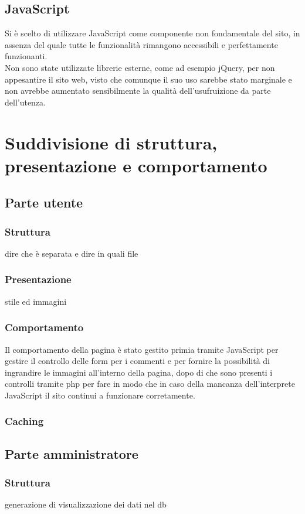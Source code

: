 \documentclass[openany, a4paper, 12pt]{report}
\begin{document}
	\subsection{JavaScript}
	Si è scelto di utilizzare JavaScript come componente non fondamentale del sito, in assenza del quale tutte le funzionalità rimangono accessibili e perfettamente funzionanti.\\
	Non sono state utilizzate librerie esterne, come ad esempio jQuery, per non appesantire il sito web, visto che comunque il suo uso sarebbe stato marginale e non avrebbe aumentato sensibilmente la qualità dell'usufruizione da parte dell'utenza.
	
	\section{Suddivisione di struttura, presentazione e comportamento}
		\subsection{Parte utente}
			\subsubsection{Struttura}
			dire che è separata e dire in quali file
			\subsubsection{Presentazione}
			stile ed immagini
			\subsubsection{Comportamento}
			Il comportamento della pagina è stato gestito primia tramite JavaScript per gestire il controllo delle form per i commenti e per fornire la possibilità di ingrandire le immagini all'interno della pagina, dopo di che sono presenti i controlli tramite php per fare in modo che in caso della mancanza dell'interprete JavaScript il sito continui a funzionare corretamente. 
			\subsubsection{Caching}
	
	\subsection{Parte amministratore}
		\subsubsection{Struttura}
		generazione di visualizzazione dei dati nel db
\end{document}
